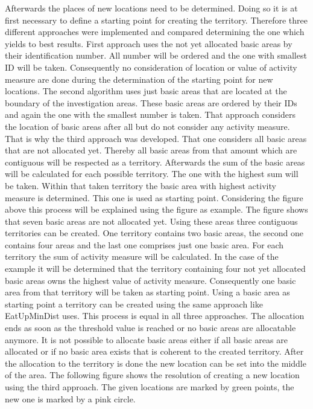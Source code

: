 Afterwards the places of new locations need to be determined. Doing so it is at first necessary to define a starting point for creating the territory. Therefore three different approaches were implemented and compared determining the one which yields to best results. First approach uses the not yet allocated basic areas by their identification number. All number will be ordered and the one with smallest ID will be taken. Consequently no consideration of location or value of activity measure are done during the determination of the starting point for new locations. The second algorithm uses just basic areas that are located at the boundary of the investigation areas. These basic areas are ordered by their IDs and again the one with the smallest number is taken. That approach considers the location of basic areas after all but do not consider any activity measure. That is why the third approach was developed. That one considers all basic areas that are not allocated yet. Thereby all basic areas from that amount which are contiguous will be respected as a territory. Afterwards the sum of the basic areas will be calculated for each possible territory. The one with the highest sum will be taken. Within that taken territory the basic area with highest activity measure is determined. This one is used as starting point. Considering the figure above this process will be explained using the figure as example. The figure shows that seven basic areas are not allocated yet. Using these areas three contiguous territories can be created. One territory contains two basic areas, the second one contains four areas and the last one comprises just one basic area. For each territory the sum of activity measure will be calculated. In the case of the example it will be determined that the territory containing four not yet allocated basic areas owns the highest value of activity measure. Consequently one basic area from that territory will be taken as starting point. Using a basic area as starting point a territory can be created using the same approach like EatUpMinDist uses. This process is equal in all three approaches. The allocation ends as soon as the threshold value is reached or no basic areas are allocatable anymore. It is not possible to allocate basic areas either if all basic areas are allocated or if no basic area exists that is coherent to the created territory. After the allocation to the territory is done the new location can be set into the middle of the area. The following figure shows the resolution of creating a new location using the third approach. The given locations are marked by green points, the new one is marked by a pink circle.

